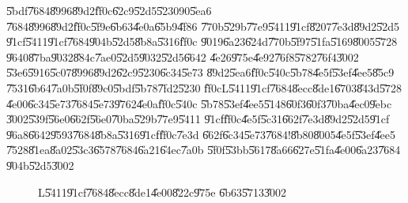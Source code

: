 \begin{case}
\U{5bdf}\U{7684}\U{8996}\U{89d2}\U{ff0c}\U{62c9}\U{52d5}\U{5230}90\U{5ea6}%
\U{7684}\U{8996}\U{89d2}\U{ff0c}\U{5f9e}\U{6b63}\U{4e0a}\U{65b9}\U{4f86}%
\U{770b}\U{529b}\U{77e9}\U{5411}\U{91cf}\U{8207}\U{7e3d}\U{89d2}\U{52d5}%
\U{91cf}\U{5411}\U{91cf}\U{7684}\U{904b}\U{52d5}\U{8b8a}\U{5316}\U{ff0c}%
\U{9019}\U{6a23}\U{624d}\U{770b}\U{5f97}\U{51fa}\U{5169}\U{8005}\U{5728}%
\U{9640}\U{87ba}\U{9032}\U{884c}\U{7ae0}\U{52d5}\U{9032}\U{52d5}\U{6642}%
\U{4e26}\U{975e}\U{4e92}\U{76f8}\U{5782}\U{76f4}\U{3002}\newline
\U{53e6}\U{5916}\U{5c07}\U{8996}\U{89d2}\U{62c9}\U{5230}\U{6c34}\U{5e73}%
\U{89d2}\U{5ea6}\U{ff0c}\U{540c}\U{5b78}\U{4e5f}\U{53ef}\U{4ee5}\U{85c9}%
\U{7531}\U{6b64}\U{7a0b}\U{5f0f}\U{89c0}\U{5bdf}\U{5b78}\U{7fd2}\U{5230}%
\U{ff0c}L\U{5411}\U{91cf}\U{7684}\U{8ecc}\U{8de1}\U{6703}\U{843d}\U{5728}%
\U{4e00}\U{6c34}\U{5e73}\U{7684}\U{5e73}\U{9762}\U{4e0a}\U{ff0c}\U{540c}%
\U{5b78}\U{53ef}\U{4ee5}\U{5148}\U{60f3}\U{60f3}\U{70ba}\U{4ec0}\U{9ebc}%
\U{3002}\U{539f}\U{56e0}\U{662f}\U{56e0}\U{70ba}\U{529b}\U{77e9}\U{5411}%
\U{91cf}\U{ff0c}\U{4e5f}\U{5c31}\U{662f}\U{7e3d}\U{89d2}\U{52d5}\U{91cf}%
\U{96a8}\U{6642}\U{9593}\U{7684}\U{8b8a}\U{5316}\U{91cf}\U{ff0c}\U{7e3d}%
\U{662f}\U{6c34}\U{5e73}\U{7684}!\U{8b80}\U{8005}\U{4e5f}\U{53ef}\U{4ee5}%
\U{7528}\U{81ea}\U{8a02}\U{53c3}\U{6578}\U{7684}\U{6a21}\U{64ec}\U{7a0b}%
\U{5f0f}\U{53bb}\U{5617}\U{8a66}\U{627e}\U{51fa}\U{4e00}\U{6a23}\U{7684}%
\U{904b}\U{52d5}\U{3002}
\end{case}

\begin{figure}[th]
\caption{L\U{5411}\U{91cf}\U{7684}\U{8ecc}\U{8de1}\U{4e00}\U{822c}\U{975e}%
\U{6b63}\U{5713}\U{3002}}
\begin{center}
\end{center}
\end{figure}

